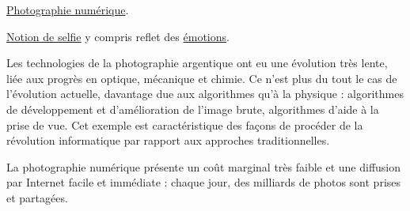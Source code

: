 \begin{jazzitemize}
\item \href{https://fr.wikipedia.org/wiki/Photographie_num\%C3\%A9rique}{Photographie numérique}.
\item \href{https://pixees.fr/du-selfie-a-loeuvre-dart-interactiveintroduction/}{Notion de selfie} y compris reflet des \href{https://pixees.fr/le-selfie-reflet-dune-emotion/}{émotions}.
\end{jazzitemize}


\begin{tcolorbox}[title={Introduction}, toprule=0pt, leftrule=0pt, rightrule=0pt, arc=0pt,
                  fonttitle=\scshape\boxtitlefont,
                  colbacktitle=white, coltitle=firstcolor, colframe=firstcolor, colback=firstcolor!10,
                  breakable, enhanced jigsaw]
Les technologies de la photographie argentique ont eu une évolution très lente, liée aux progrès en optique, mécanique et chimie. Ce n’est plus du tout le cas de l’évolution actuelle, davantage due aux algorithmes qu’à la physique : algorithmes de développement et d’amélioration de l’image brute, algorithmes d’aide à la prise de vue. Cet exemple est caractéristique des façons de procéder de la révolution informatique par rapport aux approches traditionnelles.

La photographie numérique présente un coût marginal très faible et une diffusion par Internet facile et immédiate : chaque jour, des milliards de photos sont prises et partagées.
\end{tcolorbox}

